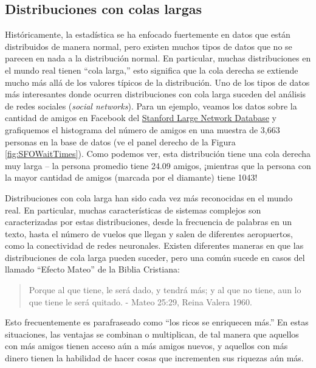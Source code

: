 \documentclass[
  12pt,
]{book}
\theoremstyle{definition}
\theoremstyle{definition}
\theoremstyle{definition}
\theoremstyle{remark}
\begin{document}
\hypertarget{distribuciones-con-colas-largas}{%
\subsection{Distribuciones con colas largas}\label{distribuciones-con-colas-largas}}

Históricamente, la estadística se ha enfocado fuertemente en datos que están distribuidos de manera normal, pero existen muchos tipos de datos que no se parecen en nada a la distribución normal. En particular, muchas distribuciones en el mundo real tienen ``cola larga,'' esto significa que la cola derecha se extiende mucho más allá de los valores típicos de la distribución. Uno de los tipos de datos más interesantes donde ocurren distribuciones con cola larga suceden del análisis de redes sociales (\emph{social networks}). Para un ejemplo, veamos los datos sobre la cantidad de amigos en Facebook del \href{https://snap.stanford.edu/data/egonets-Facebook.html}{Stanford Large Network Database} y grafiquemos el histograma del número de amigos en una muestra de 3,663 personas en la base de datos (ve el panel derecho de la Figura \ref{fig:SFOWaitTimes}). Como podemos ver, esta distribución tiene una cola derecha muy larga -- la persona promedio tiene 24.09 amigos, ¡mientras que la persona con la mayor cantidad de amigos (marcada por el diamante) tiene 1043!

Distribuciones con cola larga han sido cada vez más reconocidas en el mundo real. En particular, muchas características de sistemas complejos son caracterizadas por estas distribuciones, desde la frecuencia de palabras en un texto, hasta el número de vuelos que llegan y salen de diferentes aeropuertos, como la conectividad de redes neuronales. Existen diferentes maneras en que las distribuciones de cola larga pueden suceder, pero una común sucede en casos del llamado ``Efecto Mateo'' de la Biblia Cristiana:

\begin{quote}
Porque al que tiene, le será dado, y tendrá más; y al que no tiene, aun lo que tiene le será quitado. - Mateo 25:29, Reina Valera 1960.
\end{quote}

Esto frecuentemente es parafraseado como ``los ricos se enriquecen más.'' En estas situaciones, las ventajas se combinan o multiplican, de tal manera que aquellos con más amigos tienen acceso aún a más amigos nuevos, y aquellos con más dinero tienen la habilidad de hacer cosas que incrementen sus riquezas aún más.
\end{document}
